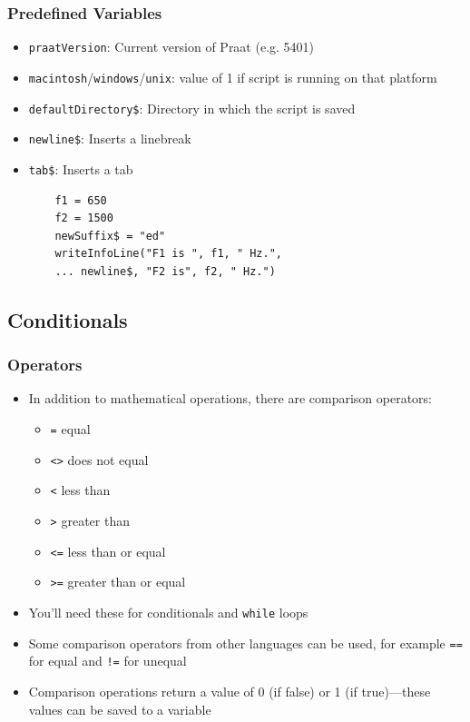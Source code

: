 \documentclass[handout]{beamer}
\begin{document}
\begin{frame}[fragile]
\frametitle{Predefined Variables}
\begin{itemize}
    \item <1-> \texttt{praatVersion}: Current version of Praat (e.g. 5401)
    \item <1-> \texttt{macintosh}/\texttt{windows}/\texttt{unix}: value of 1 if script is running on that platform
    \item <1-> \texttt{defaultDirectory\$}: Directory in which the script is saved

    \item <2-> \texttt{newline\$}: Inserts a linebreak
    \item <2-> \texttt{tab\$}: Inserts a tab

    \begin{verbatim}
    f1 = 650
    f2 = 1500
    newSuffix$ = "ed"
    writeInfoLine("F1 is ", f1, " Hz.",
    ... newline$, "F2 is", f2, " Hz.")
    \end{verbatim}

\end{itemize}
\end{frame}

\subsection{Conditionals}

\begin{frame}[fragile]
\frametitle{Operators}
\begin{itemize}
    \item <1-> In addition to mathematical operations, there are comparison operators:
    \begin{itemize}
        \item \texttt{=}\phantom{>>} equal
        \item \texttt{<>}\phantom{>} does not equal
        \item \texttt{<}\phantom{>>} less than
        \item \texttt{>}\phantom{>>} greater than
        \item \texttt{<=}\phantom{>} less than or equal
        \item \texttt{>=}\phantom{>} greater than or equal
    \end{itemize}

    \item <1-> You'll need these for conditionals and \texttt{while} loops

    \item <2-> Some comparison operators from other languages can be used, for example \texttt{==} for equal and \texttt{!=} for unequal

    \item <2-> Comparison operations return a value of 0 (if false) or 1 (if true)---these values can be saved to a variable

\end{itemize}
\end{frame}
\end{document}
